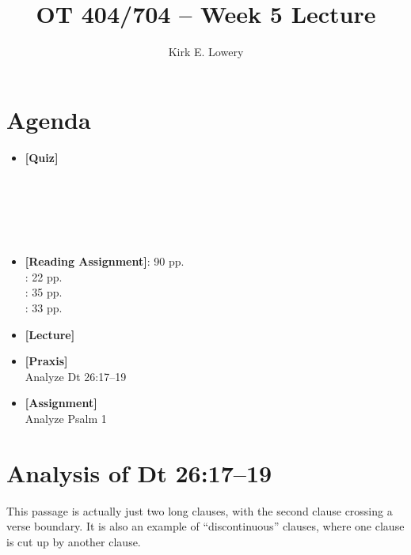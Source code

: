 \documentclass[bidi]{tufte-handout}
\title{OT 404/704 -- Week 5 Lecture}
\author{Kirk E. Lowery}
\begin{document}
\maketitle

\section{Agenda}

\begin{itemize}
 \item {\bf [Quiz]} \\
   \citealt[51--66]{Christo-H.J.-van-der-Merwe:1999rm} \\
   \citealt[6--17, 65--70, 134--139]{Saussure:1998rm} \\
   \citealt[71--91]{Payne:1997zr} \\
   \citealt{Bandstra:1992yq} \\
   \citealt{Jones:1980kx} \\
   \citealt[1--20]{Robert-D.-Van-Valin:2001yq}
 \item {\bf [Reading Assignment]}: 90 pp. \\
   \citealt{Lowery:1999kx}: 22 pp. \\
   \citealt[100--135]{Lyons1981}: 35 pp.\\
   \citealt[1--33]{Chomsky:1957vn}: 33 pp.\\
  \item {\bf [Lecture]} \\
 \item {\bf [Praxis]} \\
       Analyze Dt 26:17--19
 \item {\bf [Assignment]} \\
       Analyze Psalm 1
\end{itemize}

\section{Analysis of Dt 26:17--19}

This passage is actually just two long clauses, with the second clause crossing a verse boundary. It is also an example of “discontinuous” clauses, where one clause is cut up by another clause.
\end{document}
